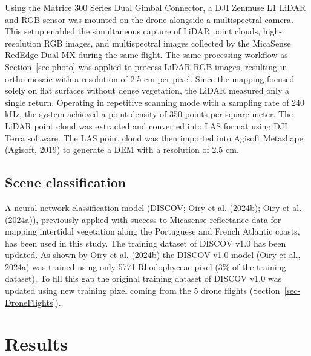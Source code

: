 \documentclass[
  letterpaper,
  DIV=11,
  numbers=noendperiod]{scrartcl}
\begin{document}
Using the Matrice 300 Series Dual Gimbal Connector, a DJI Zenmuse L1
LiDAR and RGB sensor was mounted on the drone alongside a multispectral
camera. This setup enabled the simultaneous capture of LiDAR point
clouds, high-resolution RGB images, and multispectral images collected
by the MicaSense RedEdge Dual MX during the same flight. The same
processing workflow as Section~\ref{sec-photo} was applied to process
LiDAR RGB images, resulting in ortho-mosaic with a resolution of 2.5 cm
per pixel. Since the mapping focused solely on flat surfaces without
dense vegetation, the LiDAR measured only a single return. Operating in
repetitive scanning mode with a sampling rate of 240 kHz, the system
achieved a point density of 350 points per square meter. The LiDAR point
cloud was extracted and converted into LAS format using DJI Terra
software. The LAS point cloud was then imported into Agisoft Metashape
(Agisoft, 2019) to generate a DEM with a resolution of 2.5 cm.

\subsection{Scene classification}\label{scene-classification}

A neural network classification model (DISCOV; Oiry et al. (2024b); Oiry
et al. (2024a)), previously applied with success to Micasense
reflectance data for mapping intertidal vegetation along the Portuguese
and French Atlantic coasts, has been used in this study. The training
dataset of DISCOV v1.0 has been updated. As shown by Oiry et al. (2024b)
the DISCOV v1.0 model (Oiry et al., 2024a) was trained using only 5771
Rhodophyceae pixel (3\% of the training dataset). To fill this gap the
original training dataset of DISCOV v1.0 was updated using new training
pixel coming from the 5 drone flights (Section~\ref{sec-DroneFlights}).

\section{Results}\label{results}
\end{document}
